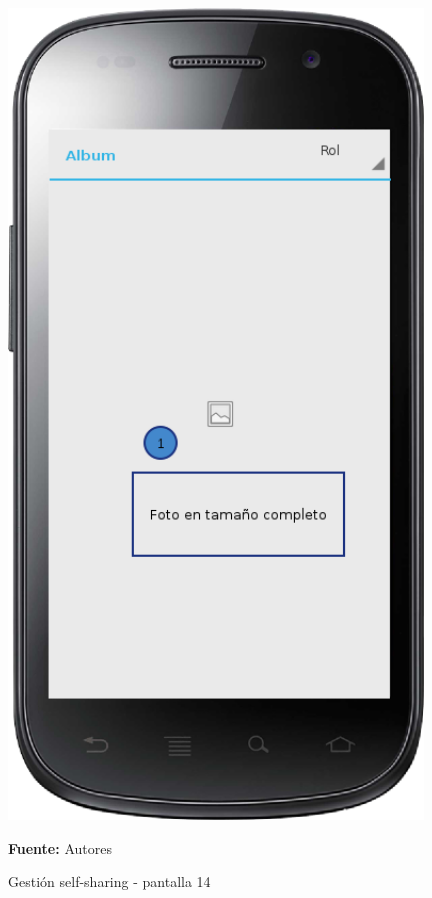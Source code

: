 \begin{figure}[!htb]
  \begin{center}
    \includegraphics[width=11cm]{./imagenes/UI/Self_sharing/self_sharing_14.png}
    \caption{Gestión self-sharing - pantalla 14}
    \label{fig:self_sharing_14}
    \textbf{Fuente:}  Autores
  \end{center}
\end{figure}


